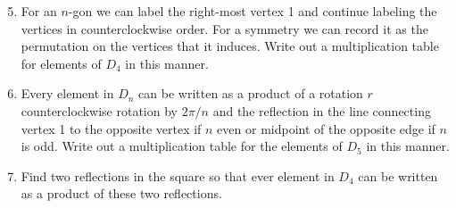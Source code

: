 \documentclass[12 pt]{article}
\begin{document}
\begin{enumerate}
\setcounter{enumi}{4}
\item For an $n$-gon we can label the right-most vertex 1 and continue labeling the vertices in counterclockwise order. For a symmetry we can record it as the permutation on the vertices that it induces. Write out a multiplication table for elements of $D_4$ in this manner.

\item Every element in $D_n$ can be written as a product of a rotation $r$ counterclockwise rotation by $2\pi/n$ and the reflection in the line connecting vertex 1 to the opposite vertex if $n$ even or midpoint of the opposite  edge if $n$ is odd. Write out a multiplication table for the elements of $D_5$ in this manner.

\item Find two reflections in the square so that ever element in $D_4$ can be written as a product of these two reflections.


 
\end{enumerate}

\vfill
\end{document}
